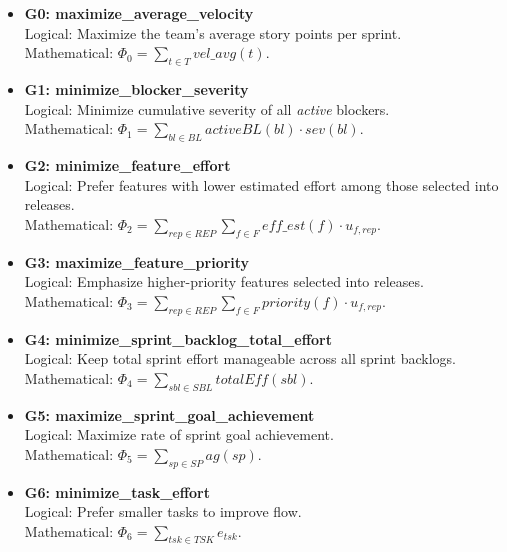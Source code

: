 \documentclass[11pt,a4paper]{article}
\begin{document}
\begin{itemize}[leftmargin=2em]

  \item \textbf{G0: maximize\_average\_velocity} \\
  Logical: Maximize the team's average story points per sprint. \\
  Mathematical: $\displaystyle \Phi_{0}=\sum_{t\in T} vel\_avg(t)$.

  \item \textbf{G1: minimize\_blocker\_severity} \\
  Logical: Minimize cumulative severity of all \emph{active} blockers. \\
  Mathematical: $\displaystyle \Phi_{1}=\sum_{bl\in BL} activeBL(bl)\cdot sev(bl)$.

  \item \textbf{G2: minimize\_feature\_effort} \\
  Logical: Prefer features with lower estimated effort among those selected into releases. \\
  Mathematical: $\displaystyle \Phi_{2}=\sum_{rep\in REP}\sum_{f\in F} eff\_est(f)\cdot u_{f,rep}$.

  \item \textbf{G3: maximize\_feature\_priority} \\
  Logical: Emphasize higher-priority features selected into releases. \\
  Mathematical: $\displaystyle \Phi_{3}=\sum_{rep\in REP}\sum_{f\in F} priority(f)\cdot u_{f,rep}$.

  \item \textbf{G4: minimize\_sprint\_backlog\_total\_effort} \\
  Logical: Keep total sprint effort manageable across all sprint backlogs. \\
  Mathematical: $\displaystyle \Phi_{4}=\sum_{sbl\in SBL} totalEff(sbl)$.

  \item \textbf{G5: maximize\_sprint\_goal\_achievement} \\
  Logical: Maximize rate of sprint goal achievement. \\
  Mathematical: $\displaystyle \Phi_{5}=\sum_{sp\in SP} ag(sp)$.

  \item \textbf{G6: minimize\_task\_effort} \\
  Logical: Prefer smaller tasks to improve flow. \\
  Mathematical: $\displaystyle \Phi_{6}=\sum_{tsk\in TSK} e_{tsk}$.


\end{itemize}
\end{document}
